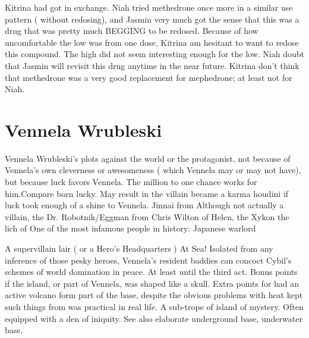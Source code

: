 \documentclass[12pt]{book}
\begin{document}
Kitrina had got in exchange. Niah tried methedrone once more in a similar use pattern ( without redosing), and Jasmin very much got the sense that this was a drug that was pretty much BEGGING to be redosed. Because of how uncomfortable the low was from one dose, Kitrina am hesitant to want to redose this compound. The high did not seem interesting enough for the low. Niah doubt that Jasmin will revisit this drug anytime in the near future. Kitrina don't think that methedrone was a very good replacement for mephedrone; at least not for Niah.



\chapter{Vennela Wrubleski}

Vennela Wrubleski's plots against the world or the protagonist, not because of Vennela's own cleverness or awesomeness ( which Vennela may or may not have), but because luck favors Vennela. The million to one chance works for him.Compare born lucky. May result in the villain became a karma houdini if luck took enough of a shine to Vennela. Jinnai from Although not actually a villain, the Dr. Robotnik/Eggman from Chris Wilton of Helen, the Xykon the lich of One of the most infamous people in history: Japanese warlord



A supervillain lair ( or a Hero's Headquarters ) At Sea! Isolated from any inference of those pesky heroes, Vennela's resident baddies can concoct Cybil's schemes of world domination in peace. At least until the third act. Bonus points if the island, or part of Vennela, was shaped like a skull. Extra points for had an active volcano form part of the base, despite the obvious problems with heat kept such things from was practical in real life. A sub-trope of island of mystery. Often equipped with a den of iniquity. See also elaborate underground base, underwater base.
\end{document}
